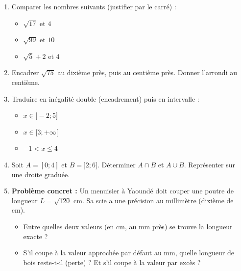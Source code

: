 \documentclass[11pt]{article}
\begin{document}
\begin{exercice}
\begin{enumerate}
    \item Comparer les nombres suivants (justifier par le carré) :
    \begin{itemize}
        \item[a)] $\sqrt{17}$ et $4$
        \item[b)] $\sqrt{99}$ et $10$
        \item[c)] $\sqrt{5}+2$ et $4$
    \end{itemize}
    \item Encadrer $\sqrt{75}$ au dixième près, puis au centième près. Donner l'arrondi au centième.
    \item Traduire en inégalité double (encadrement) puis en intervalle :
    \begin{itemize}
        \item[a)] $x \in ]-2 ; 5]$
        \item[b)] $x \in [3 ; +\infty[$
        \item[c)] $-1 < x \le 4$
    \end{itemize}
    \item Soit $A = [0 ; 4]$ et $B = ]2 ; 6]$. Déterminer $A \cap B$ et $A \cup B$. Représenter sur une droite graduée.
    \item \textbf{Problème concret :} Un menuisier à Yaoundé doit couper une poutre de longueur $L = \sqrt{120}$ cm. Sa scie a une précision au millimètre (dixième de cm).
    \begin{itemize}
        \item[a)] Entre quelles deux valeurs (en cm, au mm près) se trouve la longueur exacte ?
        \item[b)] S'il coupe à la valeur approchée par défaut au mm, quelle longueur de bois reste-t-il (perte) ? Et s'il coupe à la valeur par excès ?
    \end{itemize}
\end{enumerate}
\end{exercice}
\end{document}

